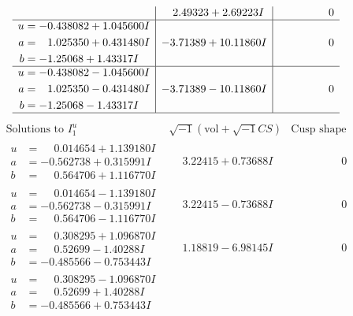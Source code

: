 \documentclass[1p]{elsarticle_modified}
\theoremstyle{definition}
\newcommand{\I}{\sqrt{-1}}
\begin{document}
$$\begin{array}{c|c|c}
 & \phantom{-}2.49323 + 2.69223 I & \phantom{-0.000000 } 0 \\ \hline\begin{aligned}
u &= -0.438082 + 1.045600 I \\
a &= \phantom{-}1.025350 + 0.431480 I \\
b &= -1.25068 + 1.43317 I\end{aligned}
 & -3.71389 + 10.11860 I & \phantom{-0.000000 } 0 \\ \hline\begin{aligned}
u &= -0.438082 - 1.045600 I \\
a &= \phantom{-}1.025350 - 0.431480 I \\
b &= -1.25068 - 1.43317 I\end{aligned}
 & -3.71389 - 10.11860 I & \phantom{-0.000000 } 0\\
 \hline 
 \end{array}$$\newpage$$\begin{array}{c|c|c}  
\text{Solutions to }I^u_{1}& \I (\text{vol} + \sqrt{-1}CS) & \text{Cusp shape}\\
 \hline 
\begin{aligned}
u &= \phantom{-}0.014654 + 1.139180 I \\
a &= -0.562738 + 0.315991 I \\
b &= \phantom{-}0.564706 + 1.116770 I\end{aligned}
 & \phantom{-}3.22415 + 0.73688 I & \phantom{-0.000000 } 0 \\ \hline\begin{aligned}
u &= \phantom{-}0.014654 - 1.139180 I \\
a &= -0.562738 - 0.315991 I \\
b &= \phantom{-}0.564706 - 1.116770 I\end{aligned}
 & \phantom{-}3.22415 - 0.73688 I & \phantom{-0.000000 } 0 \\ \hline\begin{aligned}
u &= \phantom{-}0.308295 + 1.096870 I \\
a &= \phantom{-}0.52699 - 1.40288 I \\
b &= -0.485566 - 0.753443 I\end{aligned}
 & \phantom{-}1.18819 - 6.98145 I & \phantom{-0.000000 } 0 \\ \hline\begin{aligned}
u &= \phantom{-}0.308295 - 1.096870 I \\
a &= \phantom{-}0.52699 + 1.40288 I \\
b &= -0.485566 + 0.753443 I\end{aligned}

\end{array}$$
\end{document}
